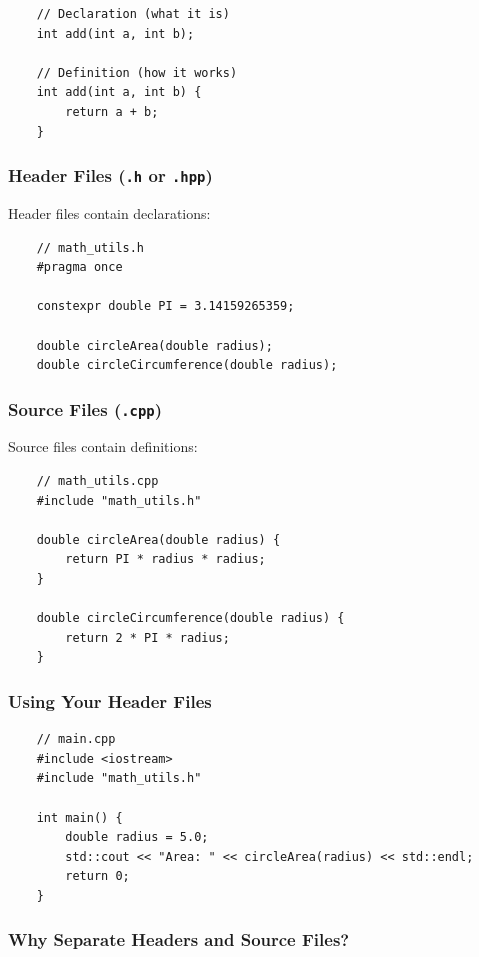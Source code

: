 \begin{lstlisting}
	// Declaration (what it is)
	int add(int a, int b);
	
	// Definition (how it works)
	int add(int a, int b) {
		return a + b;
	}
\end{lstlisting}

\subsubsection{Header Files (\texttt{.h} or \texttt{.hpp})}

Header files contain declarations:

\begin{lstlisting}
	// math_utils.h
	#pragma once
	
	constexpr double PI = 3.14159265359;
	
	double circleArea(double radius);
	double circleCircumference(double radius);
\end{lstlisting}

\subsubsection{Source Files (\texttt{.cpp})}

Source files contain definitions:

\begin{lstlisting}
	// math_utils.cpp
	#include "math_utils.h"
	
	double circleArea(double radius) {
		return PI * radius * radius;
	}
	
	double circleCircumference(double radius) {
		return 2 * PI * radius;
	}
\end{lstlisting}

\subsubsection{Using Your Header Files}

\begin{lstlisting}
	// main.cpp
	#include <iostream>
	#include "math_utils.h"
	
	int main() {
		double radius = 5.0;
		std::cout << "Area: " << circleArea(radius) << std::endl;
		return 0;
	}
\end{lstlisting}

\subsubsection{Why Separate Headers and Source Files?}

